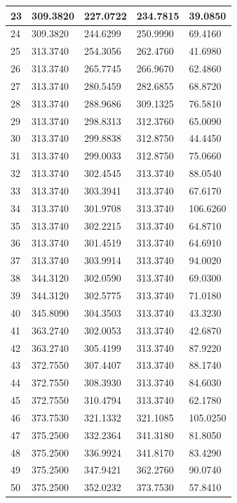 \begin{longtable}{|l|l|l|l|l|}
23 & 309.3820 & 227.0722 & 234.7815 & 39.0850 \\\hline
24 & 309.3820 & 244.6299 & 250.9990 & 69.4160 \\\hline
25 & 313.3740 & 254.3056 & 262.4760 & 41.6980 \\\hline
26 & 313.3740 & 265.7745 & 266.9670 & 62.4860 \\\hline
27 & 313.3740 & 280.5459 & 282.6855 & 68.8720 \\\hline
28 & 313.3740 & 288.9686 & 309.1325 & 76.5810 \\\hline
29 & 313.3740 & 298.8313 & 312.3760 & 65.0090 \\\hline
30 & 313.3740 & 299.8838 & 312.8750 & 44.4450 \\\hline
31 & 313.3740 & 299.0033 & 312.8750 & 75.0660 \\\hline
32 & 313.3740 & 302.4545 & 313.3740 & 88.0540 \\\hline
33 & 313.3740 & 303.3941 & 313.3740 & 67.6170 \\\hline
34 & 313.3740 & 301.9708 & 313.3740 & 106.6260 \\\hline
35 & 313.3740 & 302.2215 & 313.3740 & 64.8710 \\\hline
36 & 313.3740 & 301.4519 & 313.3740 & 64.6910 \\\hline
37 & 313.3740 & 303.9914 & 313.3740 & 94.0020 \\\hline
38 & 344.3120 & 302.0590 & 313.3740 & 69.0300 \\\hline
39 & 344.3120 & 302.5775 & 313.3740 & 71.0180 \\\hline
40 & 345.8090 & 304.3503 & 313.3740 & 43.3230 \\\hline
41 & 363.2740 & 302.0053 & 313.3740 & 42.6870 \\\hline
42 & 363.2740 & 305.4199 & 313.3740 & 87.9220 \\\hline
43 & 372.7550 & 307.4407 & 313.3740 & 88.1740 \\\hline
44 & 372.7550 & 308.3930 & 313.3740 & 84.6030 \\\hline
45 & 372.7550 & 310.4794 & 313.3740 & 62.1780 \\\hline
46 & 373.7530 & 321.1332 & 321.1085 & 105.0250 \\\hline
47 & 375.2500 & 332.2364 & 341.3180 & 81.8050 \\\hline
48 & 375.2500 & 336.9924 & 341.8170 & 83.4290 \\\hline
49 & 375.2500 & 347.9421 & 362.2760 & 90.0740 \\\hline
50 & 375.2500 & 352.0232 & 373.7530 & 57.8410 \\\hline

\end{longtable}
